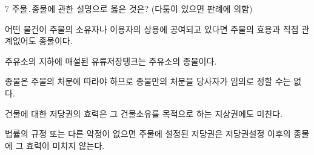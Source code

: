 \begin{question}{7}
주물․종물에 관한 설명으로 옳은 것은? (다툼이 있으면 판례에 의함)
\begin{choices}
  \item 어떤 물건이 주물의 소유자나 이용자의 상용에 공여되고 있다면 주물의 효용과 직접 관계없어도 종물이다.
  \item 주유소의 지하에 매설된 유류저장탱크는 주유소의 종물이다.
  \item 종물은 주물의 처분에 따라야 하므로 종물만의 처분을 당사자가 임의로 정할 수는 없다.
  \item 건물에 대한 저당권의 효력은 그 건물소유를 목적으로 하는 지상권에도 미친다.
  \item 법률의 규정 또는 다른 약정이 없으면 주물에 설정된 저당권은 저당권설정 이후의 종물에 그 효력이 미치지 않는다.
\end{choices}
\end{question}
